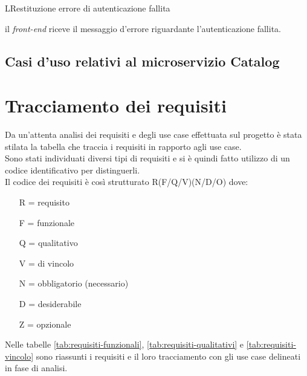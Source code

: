 \begin{usecase}{13}{L}{Restituzione errore di autenticazione fallita}



	\begin{ucscenarioprincipale}
		\item il \textit{front-end} riceve il messaggio d'errore riguardante l'autenticazione fallita.
	\end{ucscenarioprincipale}


	\label{uc:vis-errore-auth-l}

\end{usecase}


\subsection{Casi d'uso relativi al microservizio Catalog}




\section{Tracciamento dei requisiti}

Da un'attenta analisi dei requisiti e degli use case effettuata sul progetto è stata stilata la tabella che traccia i requisiti in rapporto agli use case.\\
Sono stati individuati diversi tipi di requisiti e si è quindi fatto utilizzo di un codice identificativo per distinguerli.\\
Il codice dei requisiti è così strutturato R(F/Q/V)(N/D/O) dove:
\begin{enumerate}
	\item[R =] requisito
    \item[F =] funzionale
    \item[Q =] qualitativo
    \item[V =] di vincolo
    \item[N =] obbligatorio (necessario)
    \item[D =] desiderabile
    \item[Z =] opzionale
\end{enumerate}
Nelle tabelle \ref{tab:requisiti-funzionali}, \ref{tab:requisiti-qualitativi} e \ref{tab:requisiti-vincolo} sono riassunti i requisiti e il loro tracciamento con gli use case delineati in fase di analisi.


